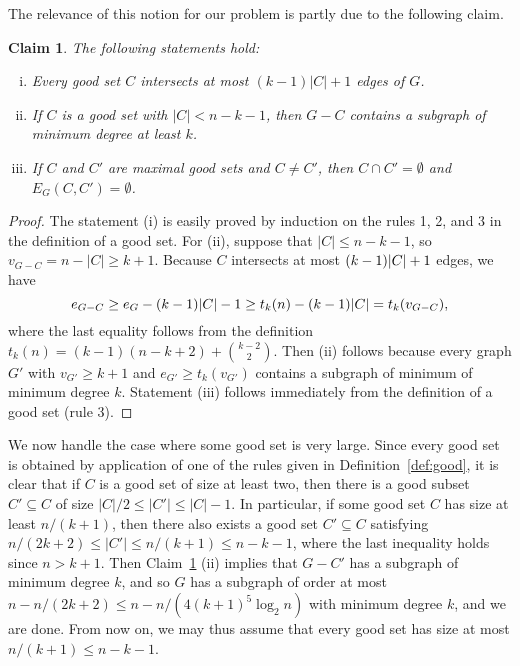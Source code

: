 \documentclass[11pt]{article}
\numberwithin{theorem}{section}
\newtheorem{claim}[theorem]{Claim}
\DeclarePairedDelimiter\abs{\lvert}{\rvert}
\begin{document}
The relevance of this notion for our problem is partly due to the
following claim.
\begin{claim}\label{claim:good}
  The following statements hold:
  \begin{enumerate}[(i)]
    \item Every good set $C$ intersects at most $(k-1)|C|+1$ edges of $G$.
    \item If $C$ is a good set with $|C|< n-k-1$, then $G-C$ contains a subgraph
      of minimum degree at least $k$.
    \item If $C$ and $C'$ are maximal good sets and $C\neq C'$, then
      $C\cap C'=\emptyset$ and $E_G(C,C') = \emptyset$.
  \end{enumerate}
\end{claim}
\begin{proof}
  The statement (i) is easily proved by induction on the rules
  1, 2, and 3 in the definition of a good set. 
  For (ii), suppose
  that $|C|\leq n-k-1$, so $v_{G-C} = n- |C| \geq k+1$.
  Because $C$ intersects at most $(k-1)\abs{C}+1$ edges, we have
  \[ e_{G-C} \geq e_G-(k-1)\abs{C}-1 \geq t_k(n)- (k-1)\abs{C} = t_k(v_{G-C}), \]
  where the last equality follows from the definition $t_k(n) =
  (k-1)(n-k+2)+\binom{k-2}{2}$. Then (ii) follows because every
  graph $G'$ with $v_{G'}\geq k+1$ and $e_{G'}\geq t_k(v_{G'})$ contains a
  subgraph of minimum of minimum degree $k$.
  Statement (iii) follows immediately from the definition of a good set (rule 3).
\end{proof}

We now handle the case where some good set is very large. Since every good set
is obtained by application of one of the rules given in
Definition~\ref{def:good}, it is clear that if $C$ is a good set of size at
least two, then there is a good subset $C'\subseteq C$ of size $|C|/2\leq
|C'|\leq |C|-1$. In particular, if some good set $C$ has size at least
$n/(k+1)$, then there also exists a good set $C'\subseteq C$ satisfying
$n/(2k+2) \leq |C'|\leq n/(k+1)\leq n-k-1$, where the last inequality holds
since $n> k+1$. Then Claim~\ref{claim:good} (ii) implies that $G-C'$ has a
subgraph of minimum degree $k$, and so $G$ has a subgraph of order at most
$n-n/(2k+2) \leq n - n/(4(k+1)^5\log_2 n)$ with minimum degree $k$, and we are
done. From now on, we may thus assume that every good set has size at most
$n/(k+1)\leq n-k-1$.
\end{document}
